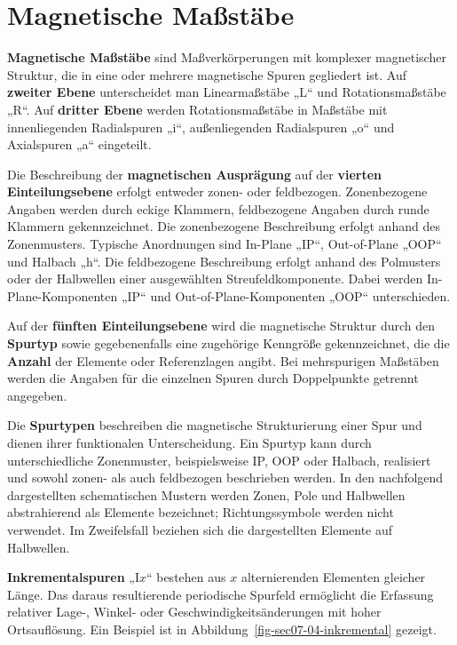 \documentclass[
  ngerman,
  a4paper,
  twoside]{scrbook}
\begin{document}
\section{Magnetische Maßstäbe}\label{sec-07-massstaebe}

\textbf{Magnetische Maßstäbe} sind Maßverkörperungen mit komplexer
magnetischer Struktur, die in eine oder mehrere magnetische Spuren
gegliedert ist. Auf \textbf{zweiter Ebene} unterscheidet man
Linearmaßstäbe „L`` und Rotationsmaßstäbe „R``. Auf \textbf{dritter
Ebene} werden Rotationsmaßstäbe in Maßstäbe mit innenliegenden
Radialspuren „i``, außenliegenden Radialspuren „o`` und Axialspuren „a``
eingeteilt.

Die Beschreibung der \textbf{magnetischen Ausprägung} auf der
\textbf{vierten Einteilungsebene} erfolgt entweder zonen- oder
feldbezogen. Zonenbezogene Angaben werden durch eckige Klammern,
feldbezogene Angaben durch runde Klammern gekennzeichnet. Die
zonenbezogene Beschreibung erfolgt anhand des Zonenmusters. Typische
Anordnungen sind In-Plane „IP``, Out-of-Plane „OOP`` und Halbach „h``.
Die feldbezogene Beschreibung erfolgt anhand des Polmusters oder der
Halbwellen einer ausgewählten Streufeldkomponente. Dabei werden
In-Plane-Komponenten „IP`` und Out-of-Plane-Komponenten „OOP``
unterschieden.

Auf der \textbf{fünften Einteilungsebene} wird die magnetische Struktur
durch den \textbf{Spurtyp} sowie gegebenenfalls eine zugehörige
Kenngröße gekennzeichnet, die die \textbf{Anzahl} der Elemente oder
Referenzlagen angibt. Bei mehrspurigen Maßstäben werden die Angaben für
die einzelnen Spuren durch Doppelpunkte getrennt angegeben.

Die \textbf{Spurtypen} beschreiben die magnetische Strukturierung einer
Spur und dienen ihrer funktionalen Unterscheidung. Ein Spurtyp kann
durch unterschiedliche Zonenmuster, beispielsweise IP, OOP oder Halbach,
realisiert und sowohl zonen- als auch feldbezogen beschrieben werden. In
den nachfolgend dargestellten schematischen Mustern werden Zonen, Pole
und Halbwellen abstrahierend als Elemente bezeichnet; Richtungssymbole
werden nicht verwendet. Im Zweifelsfall beziehen sich die dargestellten
Elemente auf Halbwellen.

\textbf{Inkrementalspuren} „I\(x\)`` bestehen aus \(x\) alternierenden
Elementen gleicher Länge. Das daraus resultierende periodische Spurfeld
ermöglicht die Erfassung relativer Lage-, Winkel- oder
Geschwindigkeitsänderungen mit hoher Ortsauflösung. Ein Beispiel ist in
Abbildung~\ref{fig-sec07-04-inkremental} gezeigt.
\end{document}
